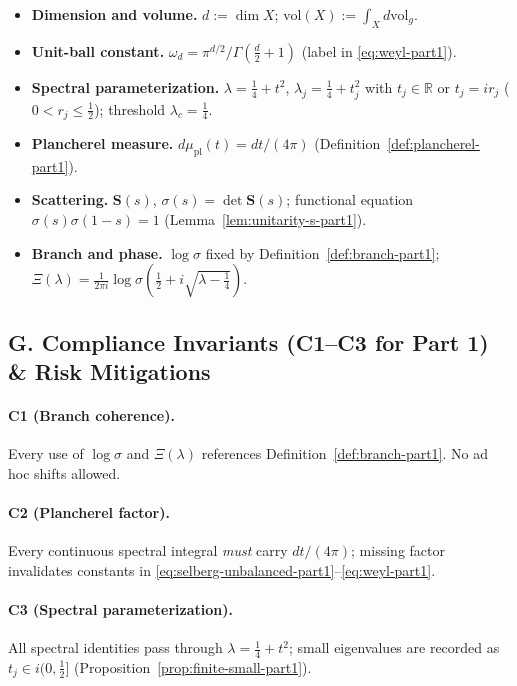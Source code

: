 \begin{itemize}
  \item \textbf{Dimension and volume.} $d:=\dim X$; $\mathrm{vol}(X):=\int_X d\mathrm{vol}_g$.
  \item \textbf{Unit-ball constant.} $\omega_d=\pi^{d/2}/\Gamma(\frac d2+1)$ (label in \eqref{eq:weyl-part1}).
  \item \textbf{Spectral parameterization.} $\lambda=\tfrac14+t^2$, $\lambda_j=\tfrac14+t_j^2$ with $t_j\in\mathbb R$ or $t_j=ir_j$ ($0<r_j\le\tfrac12$); threshold $\lambda_c=\tfrac14$.
  \item \textbf{Plancherel measure.} $d\mu_{\mathrm{pl}}(t)=dt/(4\pi)$ (Definition~\ref{def:plancherel-part1}).
  \item \textbf{Scattering.} $\mathbf S(s)$, $\sigma(s)=\det \mathbf S(s)$; functional equation $\sigma(s)\sigma(1-s)=1$ (Lemma~\ref{lem:unitarity-s-part1}).
  \item \textbf{Branch and phase.} $\log\sigma$ fixed by Definition~\ref{def:branch-part1}; $\Xi(\lambda)=\frac{1}{2\pi i}\log \sigma(\tfrac12+i\sqrt{\lambda-\tfrac14})$.
\end{itemize}


\subsection*{G. Compliance Invariants (C1–C3 for Part 1) \& Risk Mitigations}
\label{subsec:invariants-part1}

\paragraph{C1 (Branch coherence).}
Every use of $\log\sigma$ and $\Xi(\lambda)$ references Definition~\ref{def:branch-part1}. No ad hoc shifts allowed.

\paragraph{C2 (Plancherel factor).}
Every continuous spectral integral \emph{must} carry $dt/(4\pi)$; missing factor invalidates constants in \eqref{eq:selberg-unbalanced-part1}–\eqref{eq:weyl-part1}.

\paragraph{C3 (Spectral parameterization).}
All spectral identities pass through $\lambda=\tfrac14+t^2$; small eigenvalues are recorded as $t_j\in i(0,\tfrac12]$ (Proposition~\ref{prop:finite-small-part1}).

